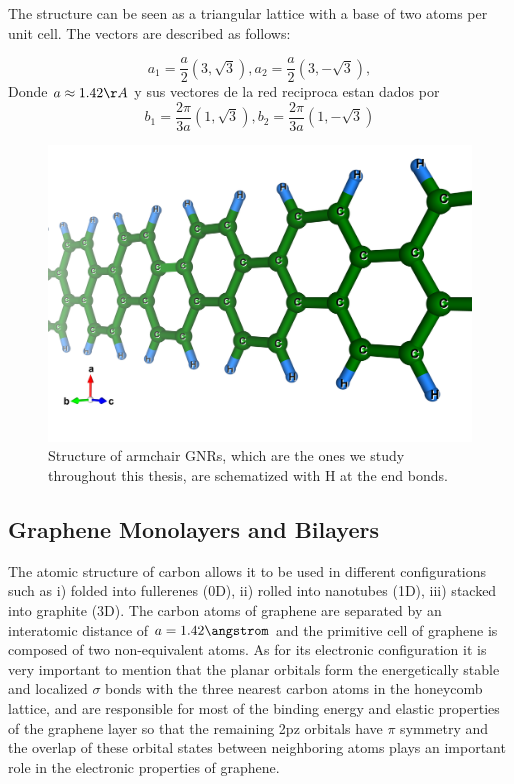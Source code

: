 The structure can be seen as a triangular lattice with a base of two atoms per unit cell. The vectors are described as follows: 

\begin{equation}
	a_{1}=\frac{a}{2}(3, \sqrt{3}), 
	a_{2}=\frac{a}{2}(3, -\sqrt{3}),
\end{equation}
 Donde $a\approx 1.42\AA$ y sus vectores de la red reciproca estan dados por 
 \begin{equation}
	b_{1}=\frac{2 \pi}{3a}(1, \sqrt{3}), b_{2}=\frac{2 \pi}{3a}(1,-\sqrt{3})
 \end{equation}

\begin{figure}[h!]
	\centering
	\includegraphics[width=0.80\linewidth]{FIGURES/Physical_Background/GNR-1}
	\caption{Structure of armchair GNRs, which are the ones we study throughout this thesis, are schematized with H at the end bonds. }
	\label{fig:introfig32}
\end{figure}


\subsection{Graphene Monolayers and Bilayers}
\vspace{-1cm}
The atomic structure of carbon allows it to be used in different configurations such as i) folded into fullerenes (0D), ii) rolled into nanotubes (1D), iii) stacked into graphite (3D). The carbon atoms of graphene are separated by an interatomic distance of $a=1.42\angstrom$ and the primitive cell of graphene is composed of two non-equivalent atoms. As for its electronic configuration it is very important to mention that the planar orbitals form the energetically stable and localized $\sigma$ bonds with the three nearest carbon atoms in the honeycomb lattice, and are responsible for most of the binding energy and elastic properties of the graphene layer so that the remaining 2pz orbitals have $\pi$ symmetry and the overlap of these orbital states between neighboring atoms plays an important role in the electronic properties of graphene.

